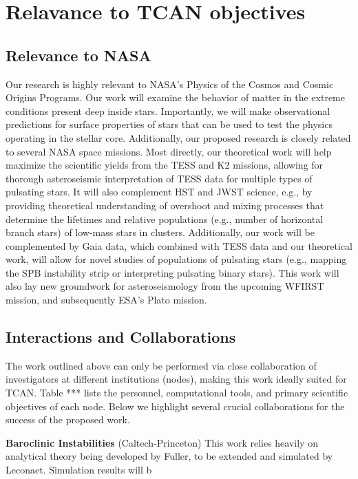 {\color{orange}

\section{Relavance to TCAN objectives}

}

\subsection{Relevance to NASA}

Our research is highly relevant to NASA's Physics of the Cosmos and Cosmic Origins Programs. Our work will examine the behavior of matter in the extreme conditions present deep inside stars. Importantly, we will make observational predictions for surface properties of stars that can be used to test the physics operating in the stellar core. Additionally, our proposed research is closely related to several NASA space missions. Most directly, our theoretical work will help maximize the scientific yields from the TESS and K2 missions, allowing for thorough asteroseismic interpretation of TESS data for multiple types of pulsating stars. It will also complement HST and JWST science, e.g., by providing theoretical understanding of overshoot and mixing processes that determine the lifetimes and relative populations (e.g., number of horizontal branch stars) of low-mass stars in clusters. Additionally, our work will be complemented by Gaia data, which combined with TESS data and our theoretical work, will allow for novel studies of populations of pulsating stars (e.g., mapping the SPB instability strip or interpreting pulsating binary stars). This work will also lay new groundwork for asteroseismology from the upcoming WFIRST mission, and subsequently ESA's Plato mission. 


\subsection{Interactions and Collaborations}

The work outlined above can only be performed via close collaboration of investigators at different institutions (nodes), making this work ideally suited for TCAN. Table *** lists the personnel, computational tools, and primary scientific objectives of each node. Below we highlight several crucial collaborations for the success of the proposed work.

{\bf Baroclinic Instabilities} (Caltech-Princeton) This work relies heavily on analytical theory being developed by Fuller, to be extended and simulated by Leconaet. Simulation results will b

